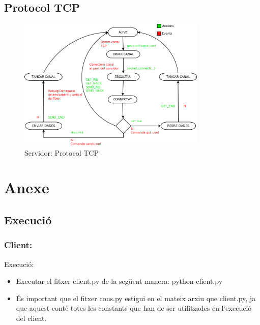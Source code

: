\documentclass[11pt]{article}
\begin{document}
\subsection{Protocol TCP}
\begin{figure}[h]
    \centering
    \includegraphics[width=0.8\textwidth]{ServidorTCP.png}
    \caption{Servidor: Protocol TCP}
    \label{fig:PrtocolTCPserv}
\end{figure}

\newpage
\section{Anexe}
	\subsection{Execució}
		\subsubsection*{Client:}
Execució:
\begin{itemize}
\item Executar el fitxer client.py de la següent manera: python client.py
\item És important que el fitxer cons.py estigui en el mateix arxiu que client.py, ja que aquest conté totes les constants que han de ser utilitzades en l'execució del client.
\end{itemize}
\end{document}
